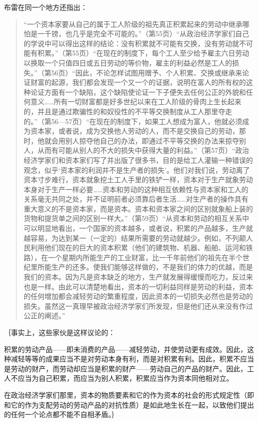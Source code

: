 布雷在同一个地方还指出：

\begin{quote}{“一个资本家要从自己的属于工人阶级的祖先真正积累起来的劳动中继承哪怕是一千镑，也几乎是完全不可能的。”（第55页）“从政治经济学家们自己的学说中可以得出这样的结论：没有积累就不可能有交换，没有劳动就不可能有积累。”（第55页）“在现在的制度下，每个工人至少给予雇主六日劳动以换取一个只值四日或五日劳动的等价物，雇主的利益必然是工人的损失。”（第56页）“因此，不论怎样试图用赠予、个人积累、交换或继承来论证财富的起源，我们都会发现一个又一个的证据，说明在富人的所有权的这种论证方面有一个缺陷，这个缺陷使论证一下子便失去任何公正的外貌和任何意义……所有一切财富都是好多世纪以来在工人阶级的骨肉上生长起来的，并且是通过欺骗性的和奴役性的不平等交换制度从工人那里夺走的。”（第56—57页）“在现在的制度下，如果工人想成为富人，他就必须成为资本家，或者说，成为交换他人劳动的人，而不是交换自己的劳动，那时，他就会用别人掠夺他自己的办法，即通过不平等交换的办法来掠夺别人，从而有可能从别人的不大的损失中获得大量的利益。”（第57页）“政治经济学家们和资本家们写了并出版了很多书，目的是给工人灌输一种错误的观念，似乎‘资本家的利润并不是生产者的损失’。他们对我们说，劳动离了资本寸步难行，资本就象挖土工人手里的铁铲一样，资本对于生产就象劳动本身对于生产一样必要……资本和劳动的这种相互依赖性与资本家和工人的关系毫无共同之处，并不证明前者必须靠后者生活……对生产者的操作具有重大意义的不是资本家，而是资本。资本和资本家之间的区别就象船上装的货物和提货单之间的区别一样大。”（第59页）“从资本和劳动的相互关系中可以明显地看出，一个国家的资本越多，或者说，积累的产品越多，生产就越容易，为达到某一（一定的）结果所需要的劳动就越少。例如，不列颠人民利用他们现在的巨大的资本积累（他们的建筑物、机器、船舶、运河和铁路），在一个星期内所能生产的工业财富，比一千年前他们的祖先在半个世纪里所能生产的还多。使我们能够这样做的，不是我们的体力的优越，而是我们的资本。因为凡是资本缺乏的地方，生产就发展得缓慢而吃力，反过来也是一样。由此可以清楚地看出，资本的一切利益同样是劳动的利益，资本的任何增加都会减轻劳动的繁重程度，因此资本的一切损失必然也是劳动的损失。虽然这一真理早被政治经济学家们所发现，但是他们还从来没有作过公正的阐述。”}\end{quote}

｛事实上，这些家伙是这样议论的：

积累的劳动产品——即未消费的产品——减轻劳动，并使劳动更有成效。因此，这种减轻等等的成果应当不是对劳动本身有利，而是对积累有利。因此，积累不应当是劳动的财产，而劳动却应当是积累的财产——劳动自己的产品的财产。因此，工人不应当为自己积累，而应当为别人积累，积累应当作为资本同他相对立。

在政治经济学家们那里，资本的物质要素和它的作为资本的社会的形式规定性（即和它的作为支配劳动的劳动产品的对抗性质）是如此地生长在一起，以致他们提出的任何一个论点都不能不自相矛盾。｝

